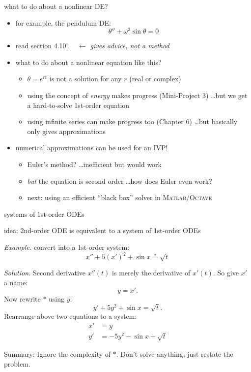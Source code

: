 \documentclass[urlcolor=blue,dvipsnames]{beamer}
\newcommand{\Matlab}{\textsc{Matlab}\xspace}
\newcommand{\Octave}{\textsc{Octave}\xspace}
\begin{document}
\begin{frame}{what to do about a nonlinear DE?}

\begin{itemize}
\item for example, the pendulum DE:
    $$\theta'' + \omega^2 \sin\theta = 0$$
\item \alert{read section 4.10!}  $\quad \longleftarrow$ \emph{gives advice, not a method}
\item what to do about a nonlinear equation like this?
    \begin{itemize}
    \item $\theta=e^{rt}$ is not a solution for any $r$ (real or complex)
    \item using the concept of \emph{energy} makes progress (Mini-Project 3) \dots but we get a hard-to-solve 1st-order equation
    \item using infinite series can make progress too (Chapter 6) \dots but basically only gives approximations
    \end{itemize}
\item numerical approximations can be used for an IVP!
    \begin{itemize}
    \item Euler's method? \dots inefficient but would work
    \item \emph{but} the equation is second order \dots how does Euler even work?
    \item next: using an efficient ``black box'' solver in \footnotesize \Matlab/\Octave
    \end{itemize}
\end{itemize}
\end{frame}


\begin{frame}{systems of 1st-order ODEs}

\medskip

   \centerline{idea: \alert{2nd-order ODE is equivalent to a system of 1st-order ODEs}}

\bigskip
\noindent \emph{Example.} convert into a 1st-order system:
    $$x''+5(x')^2+\sin x \stackrel{\ast}{=} \sqrt{t}$$

\noindent \emph{Solution.}  Second derivative $x''(t)$ is merely the derivative of $x'(t)$.  So give $x'$ a name:
    $$y = x'.$$
Now rewrite $\ast$ using $y$:
    $$y' + 5 y^2 + \sin x = \sqrt{t}.$$
Rearrange above two equations to a system:
\begin{align*}
x' &= y \\
y' &= - 5 y^2 - \sin x + \sqrt{t}
\end{align*}

\medskip
\scriptsize
\alert{Summary: Ignore the complexity of $\ast$.  Don't solve anything, just restate the problem.}
\end{frame}
\end{document}
